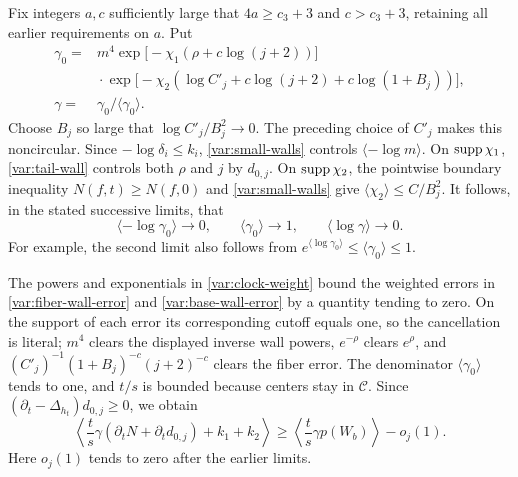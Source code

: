 Fix integers $a,c$ sufficiently large that $4a\ge c_3+3$ and
$c>c_3+3$, retaining all earlier requirements on $a$.  Put
\begin{equation}
 \begin{split}
 \gamma_0={}&m^4\exp\bigl[-\chi_1(\rho+c\log(j+2))\bigr]\\
 &\mathrel{}\cdot\exp\bigl[-\chi_2(
       \log C'_j+c\log(j+2)+c\log(1+B_j))\bigr],\\
 \gamma={}&\gamma_0/\langle\gamma_0\rangle.
 \end{split}
 \label{var:clock-weight}
\end{equation}
Choose $B_j$ so large that $\log C'_j/B_j^2\to0$.
The preceding choice of $C'_j$ makes this noncircular.
Since $-\log\delta_i\le k_i$, \eqref{var:small-walls} controls
$\langle-\log m\rangle$.  On $\operatorname{supp}\chi_1$,
\eqref{var:tail-wall} controls both $\rho$ and $j$ by $d_{0,j}$.
On $\operatorname{supp}\chi_2$, the pointwise boundary inequality
$N(f,t)\ge N(f,0)$ and \eqref{var:small-walls} give
$\langle\chi_2\rangle\le C/B_j^2$.
It follows, in the stated successive limits, that
\begin{equation}
 \langle-\log\gamma_0\rangle\longrightarrow0,
 \qquad \langle\gamma_0\rangle\longrightarrow1,
 \qquad \langle\log\gamma\rangle\longrightarrow0.
 \label{var:clock-loss}
\end{equation}
For example, the second limit also follows from
$e^{\langle\log\gamma_0\rangle}\le\langle\gamma_0\rangle\le1$.

The powers and exponentials in \eqref{var:clock-weight} bound the
weighted errors in \eqref{var:fiber-wall-error} and
\eqref{var:base-wall-error} by a quantity tending to zero.  On the
support of each error its corresponding cutoff equals one, so the
cancellation is literal; $m^4$ clears the displayed inverse wall
powers, $e^{-\rho}$ clears $e^\rho$, and
$(C'_j)^{-1}(1+B_j)^{-c}(j+2)^{-c}$ clears the fiber error.
The denominator $\langle\gamma_0\rangle$ tends to one, and $t/s$ is
bounded because centers stay in $\mathcal C$.
Since $(\partial_t-\Delta_{h_t})d_{0,j}\ge0$, we obtain
\begin{equation}
 \left\langle\frac ts\gamma(\partial_tN+\partial_t d_{0,j})
                      +k_1+k_2\right\rangle
 \ge\left\langle\frac ts\gamma p(W_b)\right\rangle-o_j(1).
 \label{var:clock-comparison}
\end{equation}
Here $o_j(1)$ tends to zero after the earlier limits.

